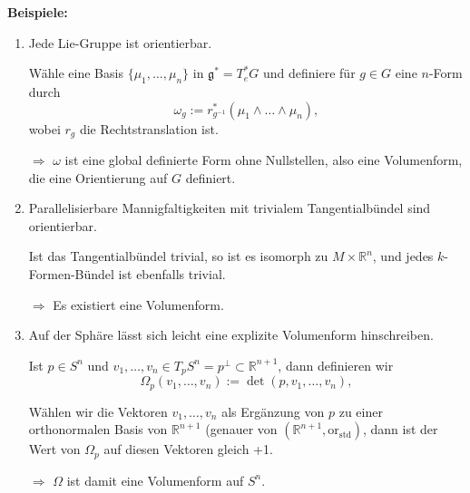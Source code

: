 \documentclass[fleqn, 12pt, letterpaper]{article}
\newcommand{\txt}[1]{\text{#1}}
\begin{document}
\textbf{Beispiele:}
\begin{enumerate}[label=\roman*)]
    \item Jede Lie-Gruppe ist orientierbar.  

    Wähle eine Basis \( \{\mu_1, \dots, \mu_n\} \) in \( \mathfrak{g}^*=T_e^*G \) und definiere für \( g \in G \) eine \( n \)-Form durch
    \[
    \omega_g := r_{g^{-1}}^* (\mu_1 \wedge \dots \wedge \mu_n),
    \]
    wobei \( r_g \) die Rechtstranslation ist.  

    \(\Rightarrow\) \( \omega \) ist eine global definierte Form ohne Nullstellen, also eine Volumenform,  
    die eine Orientierung auf \( G \) definiert.

    \item Parallelisierbare Mannigfaltigkeiten mit trivialem Tangentialbündel sind orientierbar.  

    Ist das Tangentialbündel trivial, so ist es isomorph zu \( M \times \mathbb{R}^n \), und jedes \( k \)-Formen-Bündel ist ebenfalls trivial.  

    \(\Rightarrow\) Es existiert eine Volumenform.

    \item Auf der Sphäre lässt sich leicht eine explizite Volumenform hinschreiben.  

Ist \( p \in S^n \) und \( v_1, \dots, v_n \in T_p S^n = p^\perp \subset \mathbb{R}^{n+1} \), dann definieren wir
\[
\Omega_p(v_1, \dots, v_n) := \det(p, v_1, \dots, v_n),
\]

Wählen wir die Vektoren \( v_1, \dots, v_n \) als Ergänzung von \( p \) zu einer orthonormalen Basis von \( \mathbb{R}^{n+1} \) (genauer von $(\mathbb{R}^{n+1}, \mathrm{or}_{\txt{std}})$, 
dann ist der Wert von \( \Omega_p \) auf diesen Vektoren gleich +1.  

\(\Rightarrow\) \( \Omega \) ist damit eine Volumenform auf \( S^n \).
\end{enumerate}
\vspace{1em}
\end{document}
